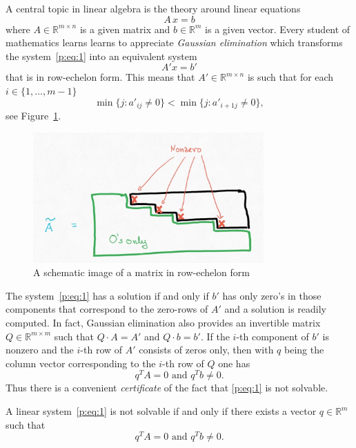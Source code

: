 A central topic in linear algebra is the theory around  linear equations 
\begin{equation} 
\label{p:eq:1}
  A \, x = b
\end{equation}
where $A ∈ ℝ^{m×n}$ is a given matrix and $b ∈ ℝ^m$ is a given vector. Every student of mathematics learns learns to appreciate \emph{Gaussian elimination} which transforms the system~\eqref{p:eq:1}  into an equivalent system  
\begin{displaymath}
  {A}' x = {b}'
\end{displaymath}
that is in row-echelon form. This means that ${A}' ∈ ℝ^{m×n}$ is such that 
  for each $i ∈ \{ 1,\dots , m-1\}$
  \begin{displaymath}
    \min\{ j : {a}'_{ij} \neq 0\} <  \min\{ j : {a}'_{i+1j} \neq 0\},
  \end{displaymath}
see Figure~\ref{fig:8}. 


\begin{figure}
  \centering
 \includegraphics[height=5cm]{figures/RowEchelon.jpg}
  \caption{A schematic image of a matrix in row-echelon form} 
\label{fig:8}
\end{figure}


The system~\eqref{p:eq:1} has a solution if and only if ${b}'$ has only zero's in those components that correspond to the zero-rows of ${A}'$ and a solution is readily computed. In fact, Gaussian elimination also provides an invertible matrix $Q ∈ ℝ^{m ×m}$ such that $Q\cdot A = {A}'$ and $Q \cdot b = {b}'$. If the $i$-th component of ${b}'$ is nonzero and the $i$-th row of ${A}'$ consists of zeros only, then with $q$ being the column vector corresponding to the $i$-th row of $Q$ one has 
\begin{displaymath}
  q^T A = 0 \text{ and } q^Tb \neq 0. 
\end{displaymath}
Thus there is a convenient \emph{certificate} of the fact that \eqref{p:eq:1} is not solvable. 


\begin{theorem}
  \label{thr:8}
  A linear system~\eqref{p:eq:1} is not solvable if and only if there exists a vector $q ∈ ℝ^m$ such that 
  \begin{displaymath}
    q^T A = 0 \text{ and } q^T b \neq 0. 
  \end{displaymath}
\end{theorem}


